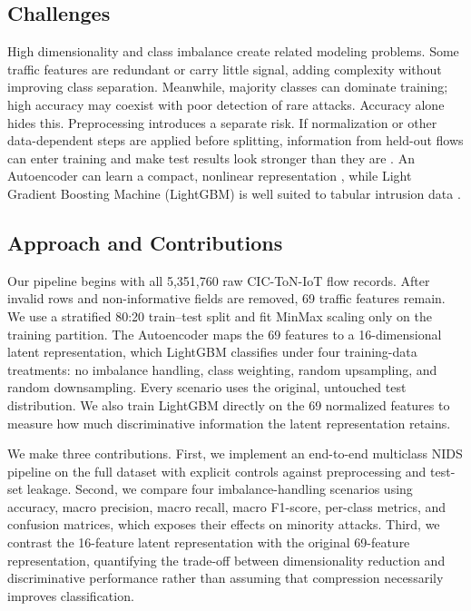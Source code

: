 \documentclass[conference]{IEEEtran}
\begin{document}
\subsection{Challenges}
High dimensionality and class imbalance create related modeling problems. Some traffic features are redundant or carry little signal, adding complexity without improving class separation. Meanwhile, majority classes can dominate training; high accuracy may coexist with poor detection of rare attacks. Accuracy alone hides this. Preprocessing introduces a separate risk. If normalization or other data-dependent steps are applied before splitting, information from held-out flows can enter training and make test results look stronger than they are \cite{Bouke2023,Manocchio2025}. An Autoencoder can learn a compact, nonlinear representation \cite{Zhang2023SIGMOD,Li2024FeatureReduction}, while Light Gradient Boosting Machine (LightGBM) is well suited to tabular intrusion data \cite{Liu2021LightGBM,Munawar2025,Wakili2025}.

\subsection{Approach and Contributions}
Our pipeline begins with all 5,351,760 raw CIC-ToN-IoT flow records. After invalid rows and non-informative fields are removed, 69 traffic features remain. We use a stratified 80:20 train--test split and fit MinMax scaling only on the training partition. The Autoencoder maps the 69 features to a 16-dimensional latent representation, which LightGBM classifies under four training-data treatments: no imbalance handling, class weighting, random upsampling, and random downsampling. Every scenario uses the original, untouched test distribution. We also train LightGBM directly on the 69 normalized features to measure how much discriminative information the latent representation retains.

We make three contributions. First, we implement an end-to-end multiclass NIDS pipeline on the full dataset with explicit controls against preprocessing and test-set leakage. Second, we compare four imbalance-handling scenarios using accuracy, macro precision, macro recall, macro F1-score, per-class metrics, and confusion matrices, which exposes their effects on minority attacks. Third, we contrast the 16-feature latent representation with the original 69-feature representation, quantifying the trade-off between dimensionality reduction and discriminative performance rather than assuming that compression necessarily improves classification.
\end{document}
